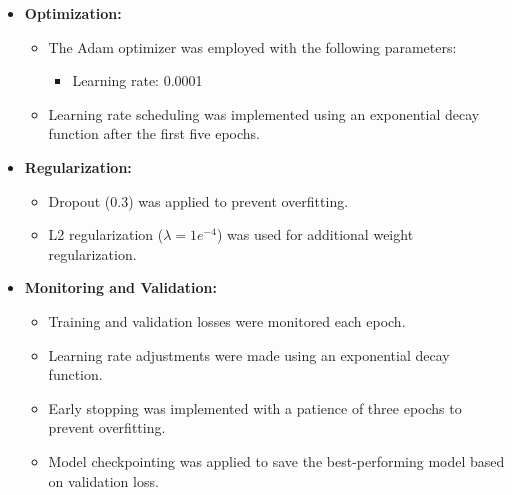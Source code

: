 \begin{itemize}
\begin{itemize}
      
            
                  \item \textbf{Optimization:}
                  \begin{itemize}
                  \item The Adam optimizer was employed with the following parameters:
                  \begin{itemize}
                        \item Learning rate: 0.0001
                  \end{itemize}
                  \item Learning rate scheduling was implemented using an exponential decay function after the first five epochs.
                  \end{itemize}
            
                  \item \textbf{Regularization:}
                  \begin{itemize}
                  \item Dropout (0.3) was applied to prevent overfitting.
                  \item L2 regularization (\(\lambda = 1e^{-4}\)) was used for additional weight regularization.
                  \end{itemize}
            
                  \item \textbf{Monitoring and Validation:}
                  \begin{itemize}
                  \item Training and validation losses were monitored each epoch.
                  \item Learning rate adjustments were made using an exponential decay function.
                  \item Early stopping was implemented with a patience of three epochs to prevent overfitting.
                  \item Model checkpointing was applied to save the best-performing model based on validation loss.
                  \end{itemize}
            \end{itemize} 
            

\end{itemize}
